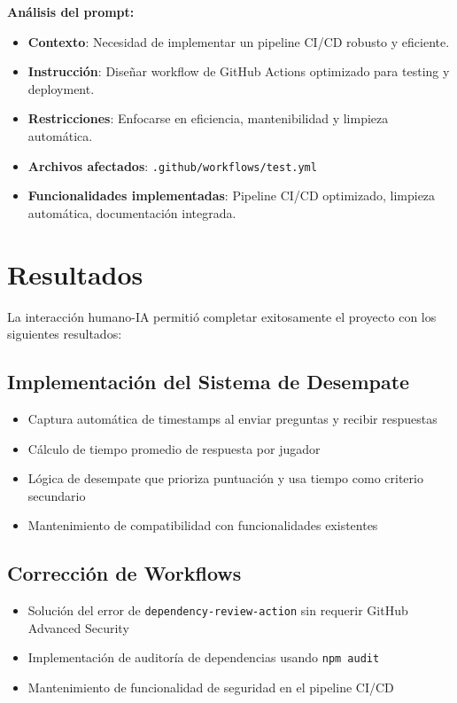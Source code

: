 \documentclass[12pt,a4paper]{article}
\begin{document}
\textbf{Análisis del prompt:}
\begin{itemize}
    \item \textbf{Contexto}: Necesidad de implementar un pipeline CI/CD robusto y eficiente.
    \item \textbf{Instrucción}: Diseñar workflow de GitHub Actions optimizado para testing y deployment.
    \item \textbf{Restricciones}: Enfocarse en eficiencia, mantenibilidad y limpieza automática.
    \item \textbf{Archivos afectados}: \texttt{.github/workflows/test.yml}
    \item \textbf{Funcionalidades implementadas}: Pipeline CI/CD optimizado, limpieza automática, documentación integrada.
\end{itemize}

\section{Resultados}

La interacción humano-IA permitió completar exitosamente el proyecto con los siguientes resultados:

\subsection{Implementación del Sistema de Desempate}
\begin{itemize}
    \item Captura automática de timestamps al enviar preguntas y recibir respuestas
    \item Cálculo de tiempo promedio de respuesta por jugador
    \item Lógica de desempate que prioriza puntuación y usa tiempo como criterio secundario
    \item Mantenimiento de compatibilidad con funcionalidades existentes
\end{itemize}

\subsection{Corrección de Workflows}
\begin{itemize}
    \item Solución del error de \texttt{dependency-review-action} sin requerir GitHub Advanced Security
    \item Implementación de auditoría de dependencias usando \texttt{npm audit}
    \item Mantenimiento de funcionalidad de seguridad en el pipeline CI/CD
\end{itemize}
\end{document}
